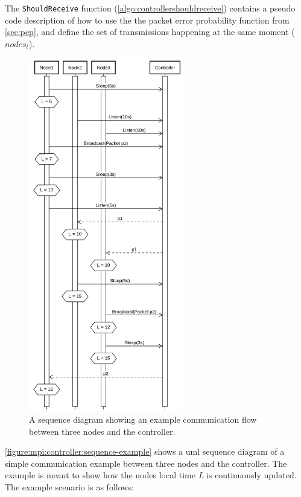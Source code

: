 The \texttt{ShouldReceive} function (\autoref{algo:controllershouldreceive}) contains a pseudo code description of how to use the the packet error probability function from \autoref{sec:pep}, and define the set of transmissions happening at the same moment ($nodes_t$). \medbreak

\begin{figure}[H]
    \centering
    \includegraphics[width=0.6\textwidth]{figures/controller_sequence.png}
    \caption{A sequence diagram showing an example communication flow between three nodes and the controller.}
    \label{figure:mpi:controller:sequence-example}
\end{figure}

\autoref{figure:mpi:controller:sequence-example} shows a \gls{uml} sequence diagram of a simple communication example between three nodes and the controller. The example is meant to show how the nodes local time \textit{L} is continuously updated. The example scenario is as follows:

